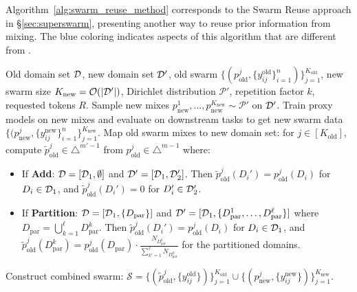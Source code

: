 







Algorithm~\ref{alg:swarm_reuse_method} corresponds to the Swarm Reuse approach in \S\ref{sec:superswarm}, presenting another way to reuse prior information from mixing. 
The blue coloring indicates aspects of this algorithm that are different from \base. 


\begin{algorithm}[htb]
   \caption{Swarm Reuse Mixing}
   \label{alg:swarm_reuse_method}
\begin{algorithmic}[1]
    \textcolor{olmoBlue}{Old domain set $\mathcal{D}$, new domain set $\mathcal{D}'$, old swarm $\{(p^j_{\text{old}}, \{y_{ij}^{\text{old}}\}_{i=1}^n)\}_{j=1}^{K_{\text{old}}}$}, new swarm size $K_{\text{new}} = \mathcal{O}(|\mathcal{D}'|)$, Dirichlet distribution $\mathcal{P}'$, repetition factor $k$, requested tokens $R$.
   \STATE Sample new mixes $p^1_{\text{new}}, \dots, p^{K_{\text{new}}}_{\text{new}} \sim \mathcal{P}'$ on $\mathcal{D}'$.
   \STATE Train proxy models on new mixes and evaluate on downstream tasks to get new swarm data $\{(p^j_{\text{new}}, \{y_{ij}^{\text{new}}\}_{i = 1}^n \}_{j =1}^{K_{\text{new}}}$.
   \STATE \textcolor{olmoBlue}{Map old swarm mixes to new domain set: for $j \in [K_{\text{old}}]$, compute $\tilde{p}^j_{\text{old}} \in \triangle^{m'-1}$ from $p^j_{\text{old}} \in \triangle^{m-1}$ where:}
   \begin{itemize}
       \item \textcolor{olmoBlue}{If \textbf{Add}: $\mathcal{D} = [\mathcal{D}_1, \emptyset]$ and $\mathcal{D}' = [\mathcal{D}_1, \mathcal{D}_2']$. Then $\tilde{p}^j_{\text{old}}(D_i') = p^j_{\text{old}}(D_i)$ for $D_i \in \mathcal{D}_1$, and $\tilde{p}^j_{\text{old}}(D_i') = 0$ for $D_i' \in \mathcal{D}_2'$.}
       \item \textcolor{olmoBlue}{If \textbf{Partition}: $\mathcal{D} = [\mathcal{D}_1, \{D_{\text{par}}\}]$ and $\mathcal{D}' = [\mathcal{D}_1, \{D_{\text{par}}^1, \dots, D_{\text{par}}^{\ell}\}]$ where $D_{\text{par}} = \bigcup_{k=1}^{\ell} D_{\text{par}}^k$. Then $\tilde{p}^j_{\text{old}}(D_i') = p^j_{\text{old}}(D_i)$ for $D_i \in \mathcal{D}_1$, and $\tilde{p}^j_{\text{old}}(D_{\text{par}}^k) = p^j_{\text{old}}(D_{\text{par}}) \cdot \frac{N_{D_{\text{par}}^k}}{\sum_{k'=1}^{\ell} N_{D_{\text{par}}^{k'}}}$ for the partitioned domains.}
   \end{itemize}
   \STATE \textcolor{olmoBlue}{Construct combined swarm: $\mathcal{S} = \{(\tilde{p}^j_{\text{old}}, \{y_{ij}^{\text{old}}\})\}_{j=1}^{K_{\text{old}}} \cup \{(p^j_{\text{new}}, \{y_{ij}^{\text{new}}\})\}_{j=1}^{K_{\text{new}}}$}.

\end{algorithmic}
\end{algorithm}
